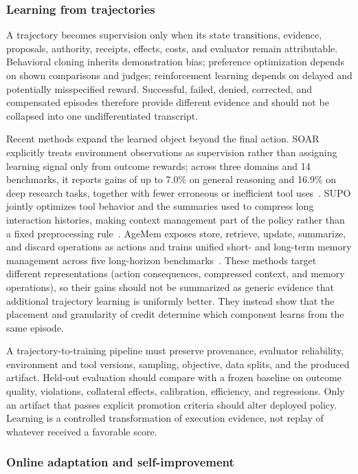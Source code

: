 \subsubsection{Learning from trajectories}

A trajectory becomes supervision only when its state transitions, evidence, proposals, authority, receipts, effects, costs, and evaluator remain attributable. Behavioral cloning inherits demonstration bias; preference optimization depends on shown comparisons and judges; reinforcement learning depends on delayed and potentially misspecified reward. Successful, failed, denied, corrected, and compensated episodes therefore provide different evidence and should not be collapsed into one undifferentiated transcript.

Recent methods expand the learned object beyond the final action. SOAR explicitly treats environment observations as supervision rather than assigning learning signal only from outcome rewards; across three domains and 14 benchmarks, it reports gains of up to 7.0\% on general reasoning and 16.9\% on deep research tasks, together with fewer erroneous or inefficient tool uses~\cite{li2026soar}. SUPO jointly optimizes tool behavior and the summaries used to compress long interaction histories, making context management part of the policy rather than a fixed preprocessing rule~\cite{lu2026supo}. AgeMem exposes store, retrieve, update, summarize, and discard operations as actions and trains unified short- and long-term memory management across five long-horizon benchmarks~\cite{yu2026agemem}. These methods target different representations (action consequences, compressed context, and memory operations), so their gains should not be summarized as generic evidence that additional trajectory learning is uniformly better. They instead show that the placement and granularity of credit determine which component learns from the same episode.

A trajectory-to-training pipeline must preserve provenance, evaluator reliability, environment and tool versions, sampling, objective, data splits, and the produced artifact. Held-out evaluation should compare with a frozen baseline on outcome quality, violations, collateral effects, calibration, efficiency, and regressions. Only an artifact that passes explicit promotion criteria should alter deployed policy. Learning is a controlled transformation of execution evidence, not replay of whatever received a favorable score.

\subsubsection{Online adaptation and self-improvement}

